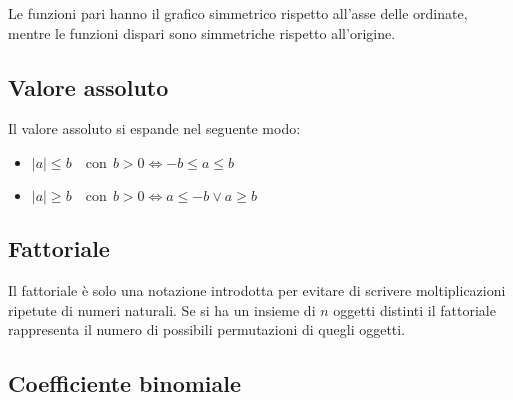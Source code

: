Le funzioni pari hanno il grafico simmetrico rispetto all'asse delle ordinate, mentre le funzioni dispari sono simmetriche rispetto all'origine.

\subsection{Valore assoluto}


Il valore assoluto si espande nel seguente modo:
\begin{itemize}
    \item $|a| \leq b \quad \mathrm{con}\;\, b > 0 \iff -b \leq a \leq b$
    \item $|a| \geq b \quad \mathrm{con}\;\, b > 0 \iff a \leq -b \lor a \geq b$
\end{itemize}

\subsection{Fattoriale}
Il fattoriale è solo una notazione introdotta per evitare di scrivere moltiplicazioni ripetute di numeri naturali. Se si ha un insieme di $n$ oggetti distinti il fattoriale rappresenta il numero di possibili permutazioni di quegli oggetti.

\subsection{Coefficiente binomiale} \label{sec_coefficiente-binomiale}

